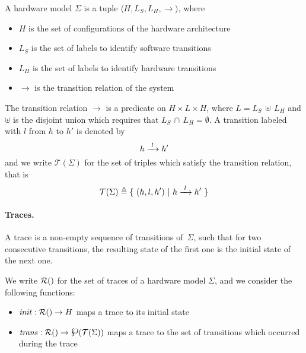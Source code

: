 \begin{definition}
  \label{def:speccert:model}
  A hardware model $\Sigma$ is a tuple
  $\langle H, L_S, L_H, \rightarrow \rangle$, where
  \begin{itemize}
  \item $H$ is the set of configurations of the hardware architecture
  \item $L_S$ is the set of labels to identify software transitions
  \item $L_H$ is the set of labels to identify hardware transitions
  \item $\rightarrow$ is the transition relation of the system
  \end{itemize}

  The transition relation \( \rightarrow \) is a predicate on
  $H \times L \times H$, where \( L = L_S\,\uplus\,L_H \) and \( \uplus \) is
  the disjoint union which requires that \( L_S\,\cap\,L_H = \emptyset \).
  A transition labeled with $l$ from $h$ to $h'$ is denoted by
  \[
    h \xrightarrow{\hskip0.3em\relax l\hskip0.3em\relax} h'
  \]
  and we write $\mathcal{T}(\Sigma)$ for the set of triples which satisfy the
  transition relation, that is
  \[
    \mathcal{T}(\Sigma) \triangleq \{\ (h, l, h')\ |\ h \xrightarrow{\hskip0.3em\relax l\hskip0.3em\relax} h'\ \}
  \]
\end{definition}

\paragraph{Traces.}
A trace is a non-empty sequence of transitions of~$\Sigma$, such that for two
consecutive transitions, the resulting state of the first one is the initial
state of the next one.


\begin{definition}[Traces]
  \label{def:speccert:trace}
  We write $\pathesLTS{Ez}$ for the set of traces of a hardware model $\Sigma$,
  and we consider the following functions:
  \begin{itemize}
  \item $\func{init} : \pathesLTS{Ez} \rightarrow H$ maps a trace to its initial
    state
  \item
    $\func{trans} : \pathesLTS{Ez} \rightarrow \powerset(\mathcal{T}(\Sigma))$
    maps a trace to the set of transitions which occurred during the trace
  \end{itemize}
\end{definition}


